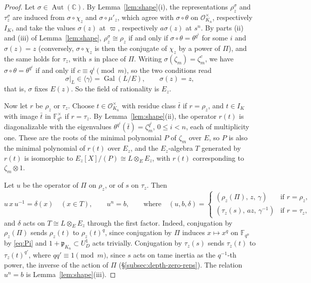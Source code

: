 \documentclass[a4paper,11pt]{amsart}
\theoremstyle{definition}
\theoremstyle{remark}
\numberwithin{equation}{section}
\DeclareMathOperator{\Gal}{Gal}
\newcommand{\F}{\mathbb{F}}
\DeclareMathOperator{\Aut}{Aut}
\newcommand{\C}{\mathbb{C}}
\newcommand{\OO}{\mathcal{O}}
\begin{document}
\begin{proof}
Let $\sigma\in\Aut(\C)$. By Lemma~\ref{lem:shape}(i), the representations $\rho_z^\sigma$ and $\tau_z^\sigma$ are induced from $\sigma\circ\chi_z$ and $\sigma\circ\mu'_z$, which agree with $\sigma\circ\theta$ on $\OO_{K_n}^\times$, respectively $I_K$, and take the values $\sigma(z)$ at $\varpi$, respectively $a\sigma(z)$ at $s^n$. By parts (ii) and (iii) of Lemma~\ref{lem:shape}, $\rho_z^\sigma\cong\rho_z$ if and only if $\sigma\circ\theta=\theta^{q^i}$ for some $i$ and $\sigma(z)=z$ (conversely, $\sigma\circ\chi_z$ is then the conjugate of $\chi_z$ by a power of $\Pi$), and the same holds for $\tau_z$, with $s$ in place of $\Pi$. Writing $\sigma(\zeta_m)=\zeta_m^c$, we have $\sigma\circ\theta=\theta^{q^i}$ if and only if $c\equiv q^i\pmod m$, so the two conditions read
\[
 \sigma|_L\in\langle\gamma\rangle=\Gal(L/E),\qquad \sigma(z)=z,
\]
that is, $\sigma$ fixes $E(z)$. So the field of rationality is $E_z$.

Now let $r$ be $\rho_z$ or $\tau_z$. Choose $t\in\OO_{K_n}^\times$ with residue class $\bar t$ if $r=\rho_z$, and $t\in I_K$ with image $\bar t$ in $\F_{q^n}^\times$ if $r=\tau_z$. By Lemma~\ref{lem:shape}(ii), the operator $r(t)$ is diagonalizable with the eigenvalues $\theta^{q^i}(\bar t)=\zeta_m^{q^i}$, $0\leq i<n$, each of multiplicity one. These are the roots of the minimal polynomial $P$ of $\zeta_m$ over $E$, so $P$ is also the minimal polynomial of $r(t)$ over $E_z$, and the $E_z$-algebra $T$ generated by $r(t)$ is isomorphic to $E_z[X]/(P)\cong L\otimes_EE_z$, with $r(t)$ corresponding to $\zeta_m\otimes1$.

Let $u$ be the operator of $\Pi$ on $\rho_z$, or of $s$ on $\tau_z$. Then
\[
 u\,x\,u^{-1}=\delta(x)\quad(x\in T),\qquad u^n=b,\qquad\text{where}\quad (u,b,\delta)=
 \begin{cases}
 (\rho_z(\Pi),\,z,\,\gamma) & \text{if } r=\rho_z,\\
 (\tau_z(s),\,az,\,\gamma^{-1}) & \text{if } r=\tau_z,
 \end{cases}
\]
and $\delta$ acts on $T\cong L\otimes_EE_z$ through the first factor. Indeed, conjugation by $\rho_z(\Pi)$ sends $\rho_z(t)$ to $\rho_z(t)^q$, since conjugation by $\Pi$ induces $x\mapsto x^q$ on $\F_{q^n}$ by \eqref{eq:Pi} and $1+\mathfrak p_{K_n}\subset U_D^1$ acts trivially. Conjugation by $\tau_z(s)$ sends $\tau_z(t)$ to $\tau_z(t)^{q'}$, where $qq'\equiv1\pmod m$, since $s$ acts on tame inertia as the $q^{-1}$-th power, the inverse of the action of $\Pi$ (\S\ref{subsec:depth-zero-reps}). The relation $u^n=b$ is Lemma~\ref{lem:shape}(iii).


\end{proof}
\end{document}
